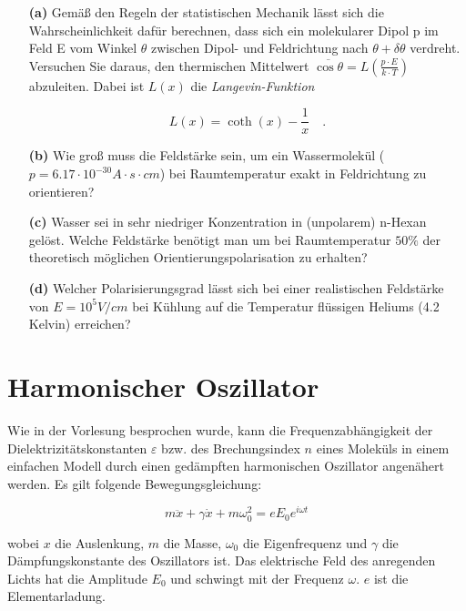 \begin{itemize}

	\item[\textbf{(a)}] Gemäß den Regeln der statistischen Mechanik lässt sich die Wahrscheinlichkeit dafür berechnen, dass sich ein molekularer Dipol p im Feld E vom Winkel $\theta$ zwischen Dipol- und Feldrichtung nach $\theta + \delta \theta$ verdreht. Versuchen Sie daraus, den thermischen Mittelwert $\overline{\cos \theta} = L(\frac{p\cdot E}{k \cdot T})$ abzuleiten. Dabei ist $L(x)$ die \textit{Langevin-Funktion}

	$$ L(x) = \coth(x) - \frac{1}{x}\quad.$$

	\item[\textbf{(b)}] Wie groß muss die Feldstärke sein, um ein Wassermolekül ($p = 6.17\cdot 10^{-30} A\cdot s \cdot cm$) bei Raumtemperatur exakt in Feldrichtung zu orientieren?
	
	\item[\textbf{(c)}] Wasser sei in sehr niedriger Konzentration in (unpolarem) n-Hexan gelöst. Welche Feldstärke benötigt man um bei Raumtemperatur $50\%$ der theoretisch möglichen Orientierungspolarisation zu erhalten?
	
	\item[\textbf{(d)}] Welcher Polarisierungsgrad lässt sich bei einer realistischen Feldstärke von $E = 10^5 V/cm$ bei Kühlung auf die Temperatur flüssigen Heliums (4.2 Kelvin) erreichen?

\end{itemize}



\section{Harmonischer Oszillator}


Wie in der Vorlesung besprochen wurde, kann die Frequenzabhängigkeit der Dielektrizitätskonstanten $\varepsilon$ bzw. des Brechungsindex $n$ eines Moleküls in einem einfachen Modell durch einen gedämpften harmonischen Oszillator angenähert werden. Es gilt folgende Bewegungsgleichung:  
		
		$$m \ddot{x} + \gamma \dot{x} + m \omega_0^2 = e E_0 e^{i\omega t}$$
		
wobei $x$ die Auslenkung, $m$ die Masse, $\omega_0$ die Eigenfrequenz und $\gamma$ die Dämpfungskonstante des Oszillators ist. Das elektrische Feld des anregenden Lichts hat die Amplitude $E_0$ und schwingt mit der Frequenz $\omega$. $e$ ist die Elementarladung.

